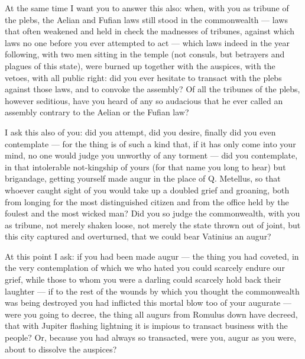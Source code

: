  At the same time I want you to answer this also: when, with you as tribune of the plebs, the Aelian and Fufian laws still stood in the commonwealth --- laws that often weakened and held in check the madnesses of tribunes, against which laws no one before you ever attempted to act --- which laws indeed in the year following, with two men sitting in the temple (not consuls, but betrayers and plagues of this state), were burned up together with the auspices, with the vetoes, with all public right: did you ever hesitate to transact with the plebs against those laws, and to convoke the assembly? Of all the tribunes of the plebs, however seditious, have you heard of any so audacious that he ever called an assembly contrary to the Aelian or the Fufian law?

 I ask this also of you: did you attempt, did you desire, finally did you even contemplate --- for the thing is of such a kind that, if it has only come into your mind, no one would judge you unworthy of any torment --- did you contemplate, in that intolerable not-kingship of yours (for that name you long to hear) but brigandage, getting yourself made augur in the place of Q. Metellus, so that whoever caught sight of you would take up a doubled grief and groaning, both from longing for the most distinguished citizen and from the office held by the foulest and the most wicked man? Did you so judge the commonwealth, with you as tribune, not merely shaken loose, not merely the state thrown out of joint, but this city captured and overturned, that we could bear Vatinius an augur?

 At this point I ask: if you had been made augur --- the thing you had coveted, in the very contemplation of which we who hated you could scarcely endure our grief, while those to whom you were a darling could scarcely hold back their laughter --- if to the rest of the wounds by which you thought the commonwealth was being destroyed you had inflicted this mortal blow too of your augurate --- were you going to decree, the thing all augurs from Romulus down have decreed, that with Jupiter flashing lightning it is impious to transact business with the people? Or, because you had always so transacted, were you, augur as you were, about to dissolve the auspices?

